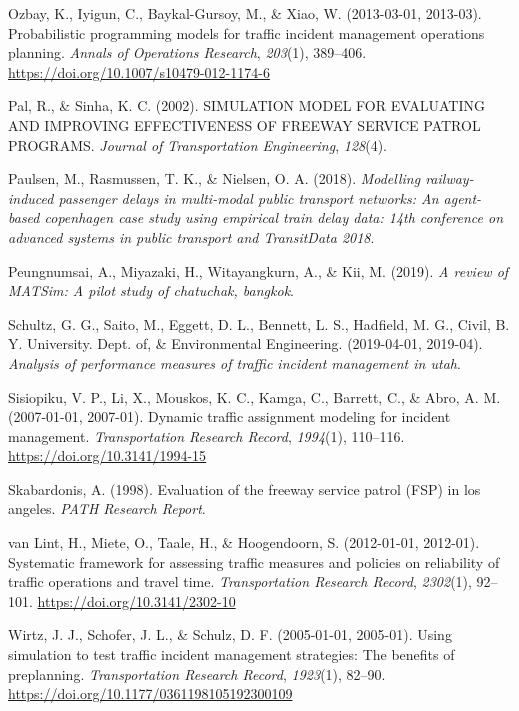 \documentclass[fancy, oneside, mastersfancy, ms]{byuthesis}
\newlength{\cslhangindent}
\newlength{\cslentryspacingunit} %
\newenvironment{CSLReferences}[2] %
 {%
  \setlength{\parindent}{0pt}
  \ifodd #1
  \let\oldpar\par
  \def\par{\hangindent=\cslhangindent\oldpar}
  \fi
  \setlength{\parskip}{#2\cslentryspacingunit}
 }%
 {}
\begin{document}
\begin{CSLReferences}{1}{0}
\leavevmode{}%
Ozbay, K., Iyigun, C., Baykal-Gursoy, M., \& Xiao, W. (2013-03-01,
2013-03). Probabilistic programming models for traffic incident
management operations planning. \emph{Annals of Operations Research},
\emph{203}(1), 389--406. \url{https://doi.org/10.1007/s10479-012-1174-6}

\leavevmode{}%
Pal, R., \& Sinha, K. C. (2002). {SIMULATION MODEL FOR EVALUATING AND
IMPROVING EFFECTIVENESS OF FREEWAY SERVICE PATROL PROGRAMS}.
\emph{Journal of Transportation Engineering}, \emph{128}(4).

\leavevmode{}%
Paulsen, M., Rasmussen, T. K., \& Nielsen, O. A. (2018). \emph{Modelling
railway-induced passenger delays in multi-modal public transport
networks: {An} agent-based copenhagen case study using empirical train
delay data: 14th conference on advanced systems in public transport and
{TransitData} 2018}.

\leavevmode{}%
Peungnumsai, A., Miyazaki, H., Witayangkurn, A., \& Kii, M. (2019).
\emph{A review of {MATSim}: {A} pilot study of chatuchak, bangkok}.

\leavevmode{}%
Schultz, G. G., Saito, M., Eggett, D. L., Bennett, L. S., Hadfield, M.
G., Civil, B. Y. University. Dept. of, \& Environmental Engineering.
(2019-04-01, 2019-04). \emph{Analysis of performance measures of traffic
incident management in utah}.

\leavevmode{}%
Sisiopiku, V. P., Li, X., Mouskos, K. C., Kamga, C., Barrett, C., \&
Abro, A. M. (2007-01-01, 2007-01). Dynamic traffic assignment modeling
for incident management. \emph{Transportation Research Record},
\emph{1994}(1), 110--116. \url{https://doi.org/10.3141/1994-15}

\leavevmode{}%
Skabardonis, A. (1998). Evaluation of the freeway service patrol ({FSP})
in los angeles. \emph{PATH Research Report}.

\leavevmode{}%
van Lint, H., Miete, O., Taale, H., \& Hoogendoorn, S. (2012-01-01,
2012-01). Systematic framework for assessing traffic measures and
policies on reliability of traffic operations and travel time.
\emph{Transportation Research Record}, \emph{2302}(1), 92--101.
\url{https://doi.org/10.3141/2302-10}

\leavevmode{}%
Wirtz, J. J., Schofer, J. L., \& Schulz, D. F. (2005-01-01, 2005-01).
Using simulation to test traffic incident management strategies: {The}
benefits of preplanning. \emph{Transportation Research Record},
\emph{1923}(1), 82--90.
\url{https://doi.org/10.1177/0361198105192300109}

\end{CSLReferences}
\end{document}

